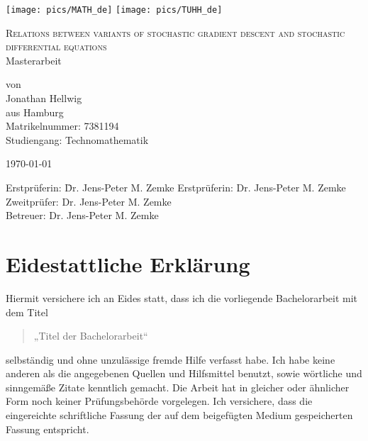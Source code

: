\documentclass[12pt]{article}
\theoremstyle{definition}
\numberwithin{equation}{section}
\begin{document}
\thispagestyle{empty}

\begin{center}
  \texttt{[image: pics/MATH\_de]}
  \hfill
  \texttt{[image: pics/TUHH\_de]}
\end{center}

\vspace*{5em}

\begin{center}
  {\Huge
    \textsc{Relations between variants of stochastic gradient descent and stochastic differential equations}\\[2em]
  }
  {\LARGE
    Masterarbeit
  }

  \vspace*{2em}

  {\Large
    von\\
    Jonathan Hellwig\\
    aus Hamburg\\
    Matrikelnummer: 7381194\\
    Studiengang: Technomathematik\\
  }
\end{center}

\vfill
\begin{center}
  \today
\end{center}
\vfill

\begin{tabbing}
  Erstprüferin: \= Dr. Jens-Peter M. Zemke\kill
  Erstprüferin: \> Dr. Jens-Peter M. Zemke\\
  Zweitprüfer:  \> Dr. Jens-Peter M. Zemke\\
  Betreuer:     \> Dr. Jens-Peter M. Zemke\\
\end{tabbing}
\newpage
\thispagestyle{empty}
\mbox{}
\newpage

\section*{Eidestattliche Erklärung}

Hiermit versichere ich an Eides statt, dass ich die vorliegende
Bachelorarbeit mit dem Titel
\begin{quote}
  „Titel der Bachelorarbeit“  
\end{quote}
selbständig und ohne unzulässige fremde Hilfe verfasst habe. Ich habe
keine anderen als die angegebenen Quellen und Hilfsmittel benutzt,
sowie wörtliche und sinngemäße Zitate kenntlich gemacht. Die Arbeit
hat in gleicher oder ähnlicher Form noch keiner Prüfungsbehörde
vorgelegen. Ich versichere, dass die eingereichte schriftliche Fassung
der auf dem beigefügten Medium gespeicherten Fassung entspricht.
\end{document}
